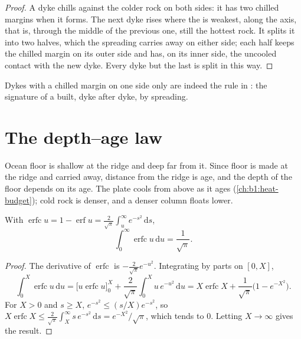 \begin{proof}
A dyke chills against the colder rock on both sides: it has two chilled
margins when it forms. The next dyke rises where the  is weakest, along
the axis, that is, through the middle of the previous one, still the hottest
rock. It splits it into two halves, which the spreading carries away on either
side; each half keeps the chilled margin on its outer side and has, on its inner
side, the uncooled contact with the new dyke. Every dyke but the last is split
in this way.
\end{proof}

Dykes with a chilled margin on one side only are indeed the rule in : the signature of a  built, dyke after dyke, by
spreading.


\section{The depth--age law}\label{sec:b1:rifts-ridges-margins:depth-age}

Ocean floor is shallow at the ridge and deep far from it. Since floor is made
at the ridge and carried away, distance from the ridge is age, and the depth of
the floor depends on its age. The plate cools from above as it ages
(\cref{ch:b1:heat-budget}); cold rock is denser, and a denser column floats
lower.

\begin{lemma}\label{lem:b1:rifts-ridges-margins:erfc}
With $\operatorname{erfc} u = 1 - \operatorname{erf} u =
\frac{2}{\sqrt\pi}\int_u^\infty e^{-s^2}\,\mathrm ds$,
\[
  \int_0^\infty \operatorname{erfc} u \,\mathrm du = \frac{1}{\sqrt\pi}.
\]
\end{lemma}

\begin{proof}
The derivative of $\operatorname{erfc}$ is $-\frac{2}{\sqrt\pi}e^{-u^2}$.
Integrating by parts on $[0, X]$,
\[
  \int_0^X \operatorname{erfc} u\,\mathrm du
  = \bigl[u \operatorname{erfc} u\bigr]_0^X + \frac{2}{\sqrt\pi}\int_0^X u\,e^{-u^2}\,\mathrm du
  = X\operatorname{erfc} X + \frac{1}{\sqrt\pi}\bigl(1 - e^{-X^2}\bigr).
\]
For $X > 0$ and $s \ge X$, $e^{-s^2} \le (s/X)e^{-s^2}$, so
$X\operatorname{erfc} X \le \frac{2}{\sqrt\pi}\int_X^\infty s\,e^{-s^2}\,\mathrm ds
= e^{-X^2}/\sqrt\pi$, which tends to 0. Letting $X \to \infty$ gives the
result.
\end{proof}

